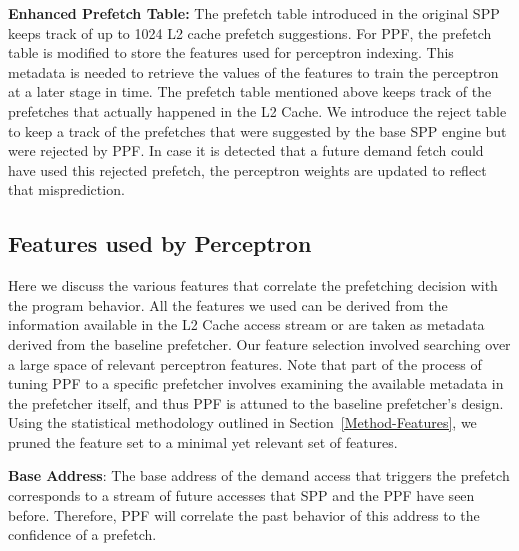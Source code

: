 \noindent \textbf{Enhanced Prefetch Table:} The prefetch table
introduced in the original SPP keeps track of up to 1024 L2 cache
prefetch suggestions. For PPF, the prefetch table is modified to store
the features used for perceptron indexing.  This metadata is needed to
retrieve the values of the features to train the perceptron at a later
stage in time. The prefetch table mentioned above keeps track of the
prefetches that actually happened in the L2 Cache.  We introduce the
reject table to keep a track of the prefetches that were suggested by
the base SPP engine but were rejected by PPF. In case it is detected
that a future demand fetch could have used this rejected prefetch, the
perceptron weights are updated to reflect that misprediction.

\subsection{Features used by Perceptron}
\label{Impl-Features}
Here we discuss the various features that correlate the prefetching
decision with the program behavior.  All the features we used can be
derived from the information available in the L2 Cache access stream
or are taken as metadata derived from the baseline prefetcher.  Our
feature selection involved searching over a large space of relevant
perceptron features.  Note that part of the process of tuning PPF to a
specific prefetcher involves examining the available metadata in the
prefetcher itself, and thus PPF is attuned to the baseline
prefetcher's design. Using the statistical methodology outlined in
Section~\ref{Method-Features}, we pruned the feature set to a minimal
yet relevant set of features.
%

\noindent \textbf{Base Address}: The base address of the demand access
that triggers the prefetch corresponds to a stream of future accesses
that SPP and the PPF have seen before. Therefore, PPF will correlate
the past behavior of this address to the confidence of a
prefetch. 


